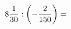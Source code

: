 \documentclass[preview]{standalone}
\begin{document}
\begin{align*}
8 { 1 \over 30 }  :  \left( - { 2 \over 150 } \right)  =
\end{align*}
\end{document}

